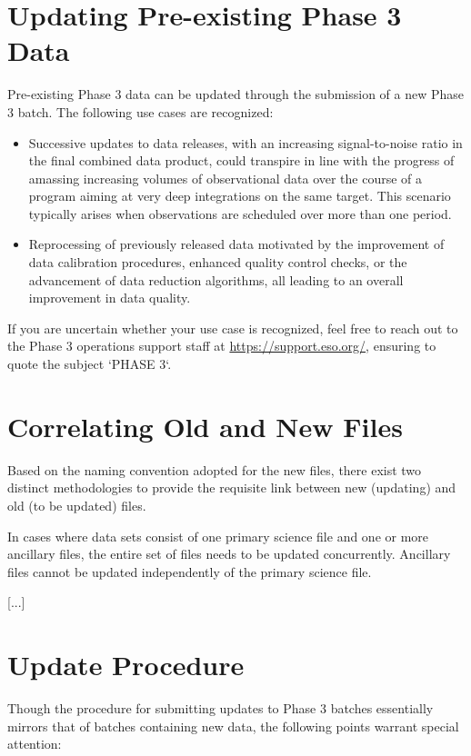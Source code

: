 \documentclass[a4paper,10pt]{book}
\begin{document}
\section{Updating Pre-existing Phase 3 Data}

Pre-existing Phase 3 data can be updated through the submission of a new Phase 3 batch. The following use cases are recognized:

\begin{itemize}
    \item Successive updates to data releases, with an increasing signal-to-noise ratio in the final combined data product, could transpire in line with the progress of amassing increasing volumes of observational data over the course of a program aiming at very deep integrations on the same target. This scenario typically arises when observations are scheduled over more than one period.
    \item Reprocessing of previously released data motivated by the improvement of data calibration procedures, enhanced quality control checks, or the advancement of data reduction algorithms, all leading to an overall improvement in data quality.
\end{itemize}

If you are uncertain whether your use case is recognized, feel free to reach out to the Phase 3 operations support staff at \url{https://support.eso.org/}, ensuring to quote the subject `PHASE 3`.

\section{Correlating Old and New Files}

Based on the naming convention adopted for the new files, there exist two distinct methodologies to provide the requisite link between new (updating) and old (to be updated) files.

In cases where data sets consist of one primary science file and one or more ancillary files, the entire set of files needs to be updated concurrently. Ancillary files cannot be updated independently of the primary science file.

[...]

\section{Update Procedure}

Though the procedure for submitting updates to Phase 3 batches essentially mirrors that of batches containing new data, the following points warrant special attention:
\end{document}
